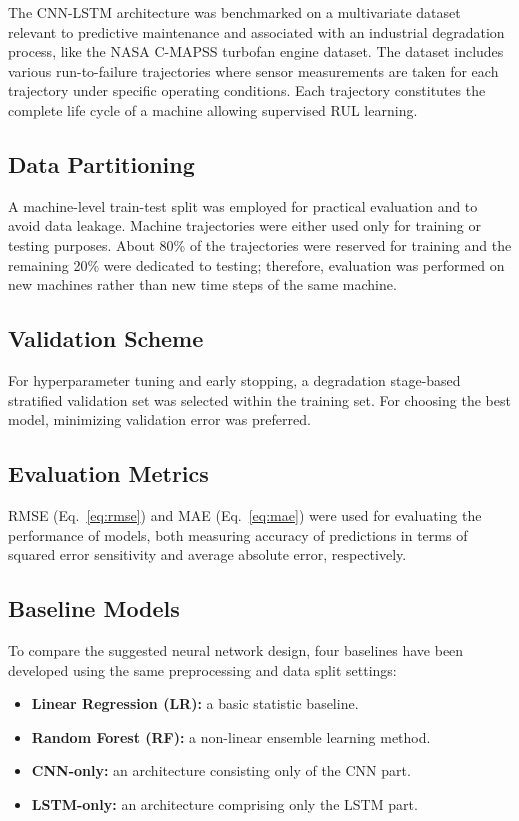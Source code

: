 \documentclass[conference]{IEEEtran}
\begin{document}
The CNN-LSTM architecture was benchmarked on a multivariate dataset relevant to predictive maintenance and associated with an industrial degradation process, like the NASA C-MAPSS turbofan engine dataset. The dataset includes various run-to-failure trajectories where sensor measurements are taken for each trajectory under specific operating conditions. Each trajectory constitutes the complete life cycle of a machine allowing supervised RUL learning.

\subsection{Data Partitioning}
A machine-level train-test split was employed for practical evaluation and to avoid data leakage. Machine trajectories were either used only for training or testing purposes. About 80\% of the trajectories were reserved for training and the remaining 20\% were dedicated to testing; therefore, evaluation was performed on new machines rather than new time steps of the same machine.

\subsection{Validation Scheme}
For hyperparameter tuning and early stopping, a degradation stage-based stratified validation set was selected within the training set. For choosing the best model, minimizing validation error was preferred.

\subsection{Evaluation Metrics}
RMSE (Eq.~\eqref{eq:rmse}) and MAE (Eq.~\eqref{eq:mae}) were used for evaluating the performance of models, both measuring accuracy of predictions in terms of squared error sensitivity and average absolute error, respectively.

\subsection{Baseline Models}
To compare the suggested neural network design, four baselines have been developed using the same preprocessing and data split settings:
\begin{itemize}
  \item \textbf{Linear Regression (LR):} a basic statistic baseline.
  \item \textbf{Random Forest (RF):} a non-linear ensemble learning method.
  \item \textbf{CNN-only:} an architecture consisting only of the CNN part.
  \item \textbf{LSTM-only:} an architecture comprising only the LSTM part.
\end{itemize}
\end{document}
